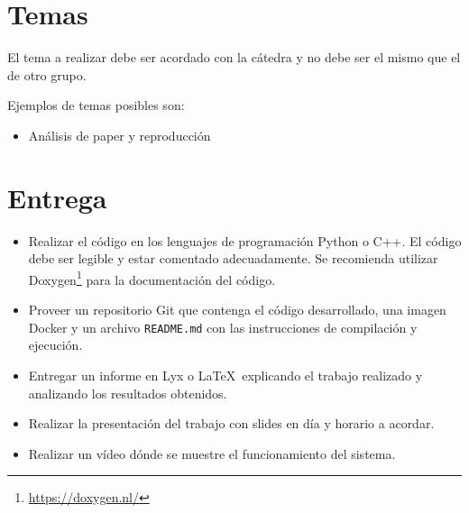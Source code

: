 \documentclass[tp]{lcc}
\begin{document}
	\maketitle
	
	
	\section{Temas}
    El tema a realizar debe ser acordado con la cátedra y no debe ser el mismo que el de otro grupo.
	
	Ejemplos de temas posibles son:    
	\begin{itemize}
		\item Análisis de paper y reproducción
	\end{itemize}
		
	\section{Entrega}
	\begin{itemize}
		
		\item Realizar el código en los lenguajes de programación Python o C++. El código debe ser legible y estar comentado adecuadamente. Se recomienda utilizar Doxygen\footnote{\url{https://doxygen.nl/}} para la documentación del código.
		
		\item Proveer un repositorio Git que contenga el código desarrollado, una imagen Docker y un archivo \lstinline{README.md} con las instrucciones de compilación y ejecución.
		
		\item Entregar un informe en Lyx o \LaTeX\  explicando el trabajo realizado y analizando los resultados obtenidos.
		
		\item Realizar la presentación del trabajo con slides en día y horario a acordar.
        
        \item Realizar un vídeo dónde se muestre el funcionamiento del sistema.         
	\end{itemize}
\end{document}
